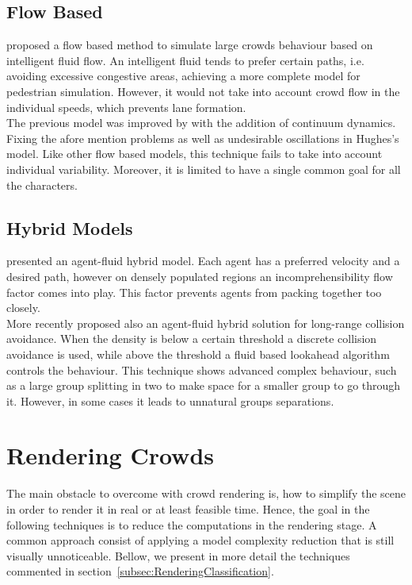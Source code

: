 \documentclass[6pt]{article} %
\begin{document}
\begin{multicols}{2}
\subsection{Flow Based}

\cite{hughes2003} proposed a flow based method to simulate large crowds behaviour based on intelligent fluid flow.
An intelligent fluid tends to prefer certain paths, i.e. avoiding excessive congestive areas, achieving a more complete model for pedestrian simulation.
However, it would not take into account crowd flow in the individual speeds, which prevents lane formation.\\

The previous model was improved by \cite{treuille2006} with the addition of continuum dynamics.
Fixing the afore mention problems as well as undesirable oscillations in Hughes's model.
Like other flow based models, this technique fails to take into account individual variability.
Moreover, it is limited to have a single common goal for all the characters.

\subsection{Hybrid Models}

\cite{Narain2009} presented an agent-fluid hybrid model.
Each agent has a preferred velocity and a desired path, however on densely populated regions an incomprehensibility flow factor comes into play.
This factor prevents agents from packing together too closely.\\

More recently \cite{lin2014} proposed also an agent-fluid hybrid solution for long-range collision avoidance.
When the density is below a certain threshold a discrete collision avoidance is used,
while above the threshold a fluid based lookahead algorithm controls the behaviour.
This technique shows advanced complex behaviour, such as a large group splitting in two to make space for a smaller group to go through it.
However, in some cases it leads to unnatural groups separations.

\section{Rendering Crowds}

The main obstacle to overcome with crowd rendering is, how to simplify the scene in order to render it in real or at least feasible time.
Hence, the goal in the following techniques is to reduce the computations in the rendering stage.
A common approach consist of applying a model complexity reduction that is still visually unnoticeable.
Bellow, we present in more detail the techniques commented in section~\ref{subsec:RenderingClassification}.


\end{multicols}
\end{document}
